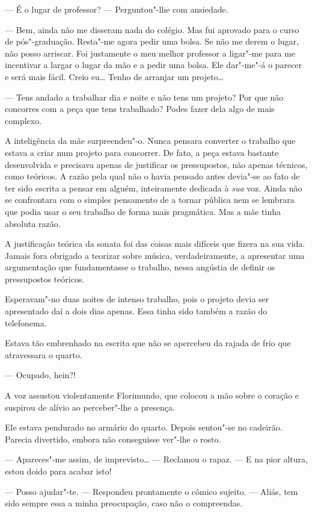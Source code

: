 --- É o lugar de professor? --- Perguntou"-lhe com ansiedade.

--- Bem, ainda não me disseram nada do colégio. Mas fui aprovado para o
curso de pós"-graduação. Resta"-me agora pedir uma bolsa. Se não me derem
o lugar, não posso arriscar. Foi justamente o meu melhor professor a
ligar"-me para me incentivar a largar o lugar da mão e a pedir uma bolsa.
Ele dar"-me"-á o parecer e será mais fácil. Creio eu\ldots{} Tenho de arranjar
um projeto\ldots{}

--- Tens andado a trabalhar dia e noite e não tens um projeto? Por que não
concorres com a peça que tens trabalhado? Podes fazer dela algo de mais
complexo.

A inteligência da mãe surpreendeu"-o. Nunca pensara converter o trabalho
que estava a criar num projeto para concorrer. De fato, a peça estava
bastante desenvolvida e precisava apenas de justificar os pressupostos,
não apenas técnicos, como teóricos. A razão pela qual não o havia
pensado antes devia"-se ao fato de ter sido escrita a pensar em alguém,
inteiramente dedicada à \emph{sua} voz. Ainda não se confrontara com o
simples pensamento de a tornar pública nem se lembrara que podia usar o
seu trabalho de forma mais pragmática. Mas a mãe tinha absoluta razão.

A justificação teórica da sonata foi das coisas mais difíceis que fizera
na sua vida. Jamais fora obrigado a teorizar sobre música,
verdadeiramente, a apresentar uma argumentação que fundamentasse o
trabalho, nessa angústia de definir os pressupostos teóricos.

Esperavam"-no duas noites de intenso trabalho, pois o projeto devia ser
apresentado daí a dois dias apenas. Essa tinha sido também a razão do
telefonema.

Estava tão embrenhado na escrita que não se apercebeu da rajada de frio
que atravessara o quarto.

--- Ocupado, hein?!

A voz assustou violentamente Florimundo, que colocou a mão sobre o
coração e suspirou de alívio ao perceber"-lhe a presença.

Ele estava pendurado no armário do quarto. Depois sentou"-se no cadeirão.
Parecia divertido, embora não conseguisse ver"-lhe o rosto.

--- Apareces"-me assim, de imprevisto\ldots{} --- Reclamou o rapaz. ---  E na pior
altura, estou doido para acabar isto!

--- Posso ajudar"-te. --- Respondeu prontamente o cômico sujeito. --- Aliás,
tem sido sempre essa a minha preocupação, caso não o compreendas.

